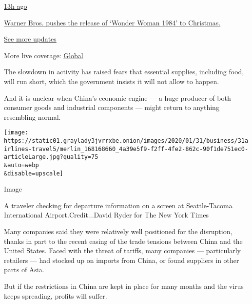 \href{https://www.nytimes3xbfgragh.onion/live/2020/09/11/business/stock-market-today-coronavirus?action=click\&pgtype=Article\&state=default\&region=MAIN_CONTENT_1\&context=storylines_live_updates\#warner-bros-pushes-the-release-of-wonder-woman-1984-to-christmas}{13h
ago}

\href{https://www.nytimes3xbfgragh.onion/live/2020/09/11/business/stock-market-today-coronavirus?action=click\&pgtype=Article\&state=default\&region=MAIN_CONTENT_1\&context=storylines_live_updates\#warner-bros-pushes-the-release-of-wonder-woman-1984-to-christmas}{Warner
Bros. pushes the release of `Wonder Woman 1984' to Christmas.}

\href{https://www.nytimes3xbfgragh.onion/live/2020/09/11/business/stock-market-today-coronavirus?action=click\&pgtype=Article\&state=default\&region=MAIN_CONTENT_1\&context=storylines_live_updates}{See
more updates}

More live coverage:
\href{https://www.nytimes3xbfgragh.onion/2020/09/11/world/covid-19-coronavirus.html?action=click\&pgtype=Article\&state=default\&region=MAIN_CONTENT_1\&context=storylines_live_updates}{Global}

The slowdown in activity has raised fears that essential supplies,
including food, will run short, which the government insists it will not
allow to happen.

And it is unclear when China's economic engine --- a huge producer of
both consumer goods and industrial components --- might return to
anything resembling normal.

\texttt{[image: https://static01.graylady3jvrrxbe.onion/images/2020/01/31/business/31airlines-travel5/merlin\_168168660\_4a39e5f9-f2ff-4fe2-862c-90f1de751ec0-articleLarge.jpg?quality=75\\\&auto=webp\\\&disable=upscale]}

Image

A traveler checking for departure information on a screen at
Seattle-Tacoma International Airport.Credit...David Ryder for The New
York Times

Many companies said they were relatively well positioned for the
disruption, thanks in part to the recent easing of the trade tensions
between China and the United States. Faced with the threat of tariffs,
many companies --- particularly retailers --- had stocked up on imports
from China, or found suppliers in other parts of Asia.

But if the restrictions in China are kept in place for many months and
the virus keeps spreading, profits will suffer.

